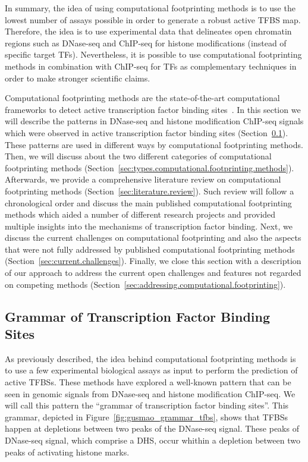In summary, the idea of using computational footprinting methods is to use the lowest number of assays possible in order to generate a robust active TFBS map. Therefore, the idea is to use experimental data that delineates open chromatin regions such as DNase-seq and ChIP-seq for histone modifications (instead of specific target TFs). Nevertheless, it is possible to use computational footprinting methods in combination with ChIP-seq for TFs as complementary techniques in order to make stronger scientific claims.

Computational footprinting methods are the state-of-the-art computational frameworks to detect active transcription factor binding sites~\cite{gusmao2016}. In this section we will describe the patterns in DNase-seq and histone modification ChIP-seq signals which were observed in active transcription factor binding sites (Section~\ref{sec:grammar.tfbs}). These patterns are used in different ways by computational footprinting methods. Then, we will discuss about the two different categories of computational footprinting methods (Section~\ref{sec:types.computational.footprinting.methods}). Afterwards, we provide a comprehensive literature review on computational footprinting methods (Section~\ref{sec:literature.review}). Such review will follow a chronological order and discuss the main published computational footprinting methods which aided a number of different research projects and provided multiple insights into the mechanisms of transcription factor binding. Next, we discuss the current challenges on computational footprinting and also the aspects that were not fully addressed by published computational footprinting methods (Section~\ref{sec:current.challenges}). Finally, we close this section with a description of our approach to address the current open challenges and features not regarded on competing methods (Section~\ref{sec:addressing.computational.footprinting}).

\subsection{Grammar of Transcription Factor Binding Sites}
\label{sec:grammar.tfbs}

As previously described, the idea behind computational footprinting methods is to use a few experimental biological assays as input to perform the prediction of active TFBSs. These methods have explored a well-known pattern that can be seen in genomic signals from DNase-seq and histone modification ChIP-seq. We will call this pattern the ``grammar of transcription factor binding sites''. This grammar, depicted in Figure~\ref{fig:gusmao_grammar_tfbs}, shows that TFBSs happen at depletions between two peaks of the DNase-seq signal. These peaks of DNase-seq signal, which comprise a DHS, occur whithin a depletion between two peaks of activating histone marks.

